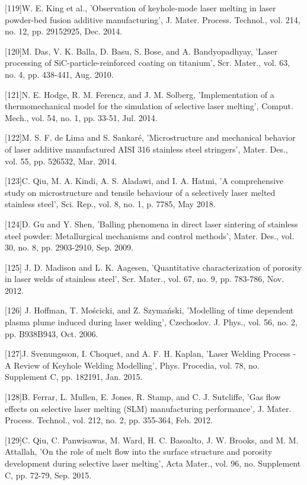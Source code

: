 \documentclass[10pt]{article}
\begin{document}
[119]W. E. King et al., 'Observation of keyhole-mode laser melting in laser powder-bed fusion additive manufacturing', J. Mater. Process. Technol., vol. 214, no. 12, pp. 29152925, Dec. 2014.

[120]M. Das, V. K. Balla, D. Basu, S. Bose, and A. Bandyopadhyay, 'Laser processing of SiC-particle-reinforced coating on titanium', Scr. Mater., vol. 63, no. 4, pp. 438-441, Aug. 2010.

[121]N. E. Hodge, R. M. Ferencz, and J. M. Solberg, 'Implementation of a thermomechanical model for the simulation of selective laser melting', Comput. Mech., vol. 54, no. 1, pp. 33-51, Jul. 2014.

[122]M. S. F. de Lima and S. Sankaré, 'Microstructure and mechanical behavior of laser additive manufactured AISI 316 stainless steel stringers', Mater. Des., vol. 55, pp. 526532, Mar. 2014.

[123]C. Qiu, M. A. Kindi, A. S. Aladawi, and I. A. Hatmi, 'A comprehensive study on microstructure and tensile behaviour of a selectively laser melted stainless steel', Sci. Rep., vol. 8, no. 1, p. 7785, May 2018.

[124]D. Gu and Y. Shen, 'Balling phenomena in direct laser sintering of stainless steel powder: Metallurgical mechanisms and control methods', Mater. Des., vol. 30, no. 8, pp. 2903-2910, Sep. 2009.

[125] J. D. Madison and L. K. Aagesen, 'Quantitative characterization of porosity in laser welds of stainless steel', Scr. Mater., vol. 67, no. 9, pp. 783-786, Nov. 2012.

[126] J. Hoffman, T. Mościcki, and Z. Szymański, 'Modelling of time dependent plasma plume induced during laser welding', Czechoslov. J. Phys., vol. 56, no. 2, pp. B938B943, Oct. 2006.

[127]J. Svenungsson, I. Choquet, and A. F. H. Kaplan, 'Laser Welding Process - A Review of Keyhole Welding Modelling', Phys. Procedia, vol. 78, no. Supplement C, pp. 182191, Jan. 2015.

[128]B. Ferrar, L. Mullen, E. Jones, R. Stamp, and C. J. Sutcliffe, 'Gas flow effects on selective laser melting (SLM) manufacturing performance', J. Mater. Process. Technol., vol. 212, no. 2, pp. 355-364, Feb. 2012.

[129]C. Qiu, C. Panwisawas, M. Ward, H. C. Basoalto, J. W. Brooks, and M. M. Attallah, 'On the role of melt flow into the surface structure and porosity development during selective laser melting', Acta Mater., vol. 96, no. Supplement C, pp. 72-79, Sep. 2015.
\end{document}
